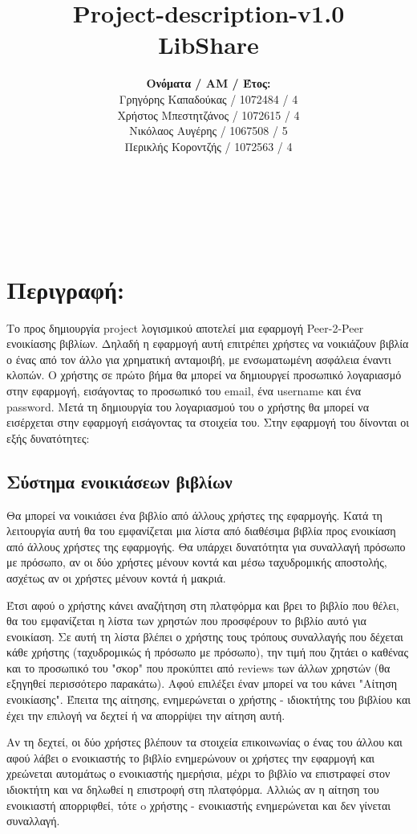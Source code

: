 \documentclass[12pt,a4paper]{article}
\title{Project-description-v1.0 \\ LibShare}
\author{\textbf{Ονόματα / ΑΜ / Έτος:} \\ Γρηγόρης Καπαδούκας / 1072484 / 4\textdegree \\ Χρήστος Μπεστητζάνος / 1072615 / 4\textdegree \\ Νικόλαος Αυγέρης / 1067508 / 5\textdegree \\ Περικλής Κοροντζής / 1072563 / 4\textdegree}
\begin{document}
\makeatletter
\begin{center}
	\LARGE{\@title} \\
	\pagebreak
	\begin{LARGE}\@author\end{LARGE} \\
\end{center}
\pagebreak

\section{Περιγραφή:}
\label{Περιγραφή}
Το προς δημιουργία project λογισμικού αποτελεί μια εφαρμογή Peer-2-Peer ενοικίασης βιβλίων. Δηλαδή η εφαρμογή αυτή επιτρέπει χρήστες να νοικιάζουν βιβλία ο ένας από τον άλλο για χρηματική ανταμοιβή, με ενσωματωμένη ασφάλεια έναντι κλοπών. Ο χρήστης σε πρώτο βήμα θα μπορεί να δημιουργεί προσωπικό λογαριασμό στην εφαρμογή, εισάγοντας το προσωπικό του email, ένα username και ένα password. Μετά τη δημιουργία του λογαριασμού του ο χρήστης θα μπορεί να εισέρχεται στην εφαρμογή εισάγοντας τα στοιχεία του. Στην εφαρμογή του δίνονται οι εξής δυνατότητες:

\subsection{Σύστημα ενοικιάσεων βιβλίων}
Θα μπορεί να νοικιάσει ένα βιβλίο από άλλους χρήστες της εφαρμογής. Κατά τη λειτουργία αυτή θα του εμφανίζεται μια λίστα από διαθέσιμα βιβλία προς ενοικίαση από άλλους χρήστες της εφαρμογής. Θα υπάρχει δυνατότητα για συναλλαγή πρόσωπο με πρόσωπο, αν οι δύο χρήστες μένουν κοντά και μέσω ταχυδρομικής αποστολής, ασχέτως αν οι χρήστες μένουν κοντά ή μακριά.

Έτσι αφού ο χρήστης κάνει αναζήτηση στη πλατφόρμα και βρει το βιβλίο που θέλει, θα του εμφανίζεται η λίστα των χρηστών που προσφέρουν το βιβλίο αυτό για ενοικίαση. Σε αυτή τη λίστα βλέπει ο χρήστης τους τρόπους συναλλαγής που δέχεται κάθε χρήστης (ταχυδρομικώς ή πρόσωπο με πρόσωπο), την τιμή που ζητάει ο καθένας και το προσωπικό του "σκορ" που προκύπτει από reviews των άλλων χρηστών (θα εξηγηθεί περισσότερο παρακάτω). Αφού επιλέξει έναν μπορεί να του κάνει "Αίτηση ενοικίασης". Έπειτα της αίτησης, ενημερώνεται ο χρήστης - ιδιοκτήτης του βιβλίου και έχει την επιλογή να δεχτεί ή να απορρίψει την αίτηση αυτή.

Αν τη δεχτεί, οι δύο χρήστες βλέπουν τα στοιχεία επικοινωνίας ο ένας του άλλου και αφού λάβει ο ενοικιαστής το βιβλίο ενημερώνουν οι χρήστες την εφαρμογή και χρεώνεται αυτομάτως ο ενοικιαστής ημερήσια, μέχρι το βιβλίο να επιστραφεί στον ιδιοκτήτη και να δηλωθεί η επιστροφή στη πλατφόρμα. 
Αλλιώς αν η αίτηση του ενοικιαστή απορριφθεί, τότε o χρήστης - ενοικιαστής ενημερώνεται και δεν γίνεται συναλλαγή.
\end{document}
